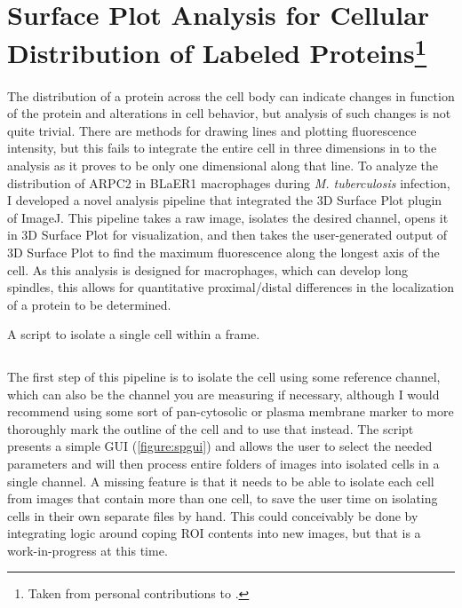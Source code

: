 \section[Surface Plot Analysis for Cellular Distribution of Labeled Proteins]{Surface Plot Analysis for Cellular Distribution of Labeled Proteins\footnote{Taken from personal contributions to \citet{Saelens2022}.}}

The distribution of a protein across the cell body can indicate changes in function of the protein and alterations in cell behavior, but analysis of such changes is not quite trivial. There are methods for drawing lines and plotting fluorescence intensity, but this fails to integrate the entire cell in three dimensions in to the analysis as it proves to be only one dimensional along that line. To analyze the distribution of ARPC2 in BLaER1 macrophages during \textit{M. tuberculosis} infection, I developed a novel analysis pipeline that integrated the 3D Surface Plot plugin of ImageJ. This pipeline takes a raw image, isolates the desired channel, opens it in 3D Surface Plot for visualization, and then takes the user\hyp{}generated output of 3D Surface Plot to find the maximum fluorescence along the longest axis of the cell. As this analysis is designed for macrophages, which can develop long spindles, this allows for quantitative proximal/distal differences in the localization of a protein to be determined.

\begin{code}
\caption{A script to isolate a single cell within a frame.}
\label{isolator}

\inputminted[breaklines,frame=single,fontsize=\small]{python}{source/autoIsolator.py}

\end{code}

The first step of this pipeline is to isolate the cell using some reference channel, which can also be the channel you are measuring if necessary, although I would recommend using some sort of pan\hyp{}cytosolic or plasma membrane marker to more thoroughly mark the outline of the cell and to use that instead. The script presents a simple GUI (\autoref{figure:spgui}) and allows the user to select the needed parameters and will then process entire folders of images into isolated cells in a single channel. A missing feature is that it needs to be able to isolate each cell from images that contain more than one cell, to save the user time on isolating cells in their own separate files by hand. This could conceivably be done by integrating logic around coping ROI contents into new images, but that is a work\hyp{}in\hyp{}progress at this time.

